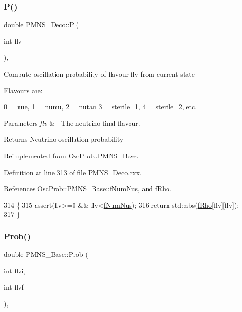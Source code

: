 \subsubsection{\texorpdfstring{P()}{P()}}
{\footnotesize\ttfamily double P\+M\+N\+S\+\_\+\+Deco\+::P (\begin{DoxyParamCaption}\item[{int}]{flv }\end{DoxyParamCaption})\hspace{0.3cm}{\ttfamily [protected]}, {\ttfamily [virtual]}}

Compute oscillation probability of flavour flv from current state

Flavours are\+: 
\begin{DoxyPre}
  0 = nue, 1 = numu, 2 = nutau
  3 = sterile\_1, 4 = sterile\_2, etc.
\end{DoxyPre}
 
\begin{DoxyParams}{Parameters}
{\em flv} & -\/ The neutrino final flavour.\\
\hline
\end{DoxyParams}
\begin{DoxyReturn}{Returns}
Neutrino oscillation probability 
\end{DoxyReturn}


Reimplemented from \hyperlink{classOscProb_1_1PMNS__Base_a0dc4d45bc3d7e03b9abbf5b4e100cc22}{Osc\+Prob\+::\+P\+M\+N\+S\+\_\+\+Base}.



Definition at line 313 of file P\+M\+N\+S\+\_\+\+Deco.\+cxx.



References Osc\+Prob\+::\+P\+M\+N\+S\+\_\+\+Base\+::f\+Num\+Nus, and f\+Rho.


\begin{DoxyCode}
314 \{
315   assert(flv>=0 && flv<\hyperlink{classOscProb_1_1PMNS__Base_a24bb74bed63569dfe88b18fa6a08060e}{fNumNus});
316   \textcolor{keywordflow}{return} std::abs(\hyperlink{classOscProb_1_1PMNS__Deco_a0488d62b4ef4cf5b43425769f5fcdbdf}{fRho}[flv][flv]);
317 \}
\end{DoxyCode}
\mbox{\label{classOscProb_1_1PMNS__Base_aec5c399b93261f1962a4b7dbbb44b973}} 
\subsubsection{\texorpdfstring{Prob()}{Prob()}\hspace{0.1cm}{\footnotesize\ttfamily [1/3]}}
{\footnotesize\ttfamily double P\+M\+N\+S\+\_\+\+Base\+::\+Prob (\begin{DoxyParamCaption}\item[{int}]{flvi,  }\item[{int}]{flvf }\end{DoxyParamCaption})\hspace{0.3cm}{\ttfamily [virtual]}, {\ttfamily [inherited]}}

